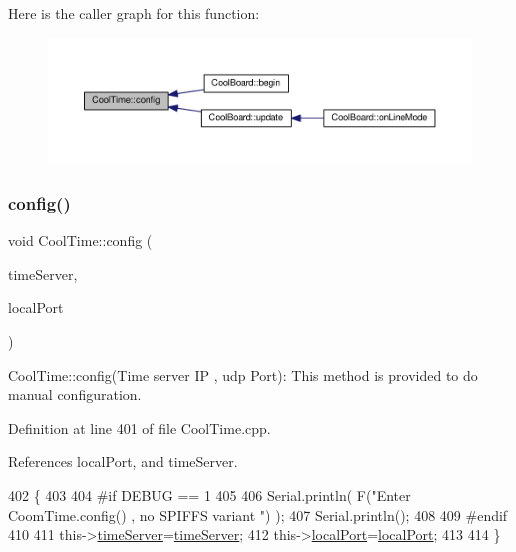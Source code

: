 Here is the caller graph for this function\+:\nopagebreak
\begin{figure}[H]
\begin{center}
\leavevmode
\includegraphics[width=350pt]{classCoolTime_a87c28260c1bc77091162cbcf1ee2e129_icgraph}
\end{center}
\end{figure}
\mbox{\label{classCoolTime_a014656d0d3f74d6391364b92b13e0780}} 
\subsubsection{\texorpdfstring{config()}{config()}\hspace{0.1cm}{\footnotesize\ttfamily [2/2]}}
{\footnotesize\ttfamily void Cool\+Time\+::config (\begin{DoxyParamCaption}\item[{I\+P\+Address}]{time\+Server,  }\item[{unsigned int}]{local\+Port }\end{DoxyParamCaption})}

Cool\+Time\+::config(\+Time server I\+P , udp Port)\+: This method is provided to do manual configuration. 

Definition at line 401 of file Cool\+Time.\+cpp.



References local\+Port, and time\+Server.


\begin{DoxyCode}
402 \{
403 
404 \textcolor{preprocessor}{#if DEBUG == 1 }
405 
406     Serial.println( F(\textcolor{stringliteral}{"Enter CoomTime.config() , no SPIFFS variant "}) );
407     Serial.println();
408 
409 \textcolor{preprocessor}{#endif }
410 
411     this->\hyperlink{classCoolTime_ad2b9858f399108cb440dd1e908916f04}{timeServer}=\hyperlink{classCoolTime_ad2b9858f399108cb440dd1e908916f04}{timeServer};
412     this->\hyperlink{classCoolTime_a2f777da44d7ba678be8185299e9b49d1}{localPort}=\hyperlink{classCoolTime_a2f777da44d7ba678be8185299e9b49d1}{localPort};
413     
414 \} 
\end{DoxyCode}
\mbox{\label{classCoolTime_acd537cd4210d7bde4e1f5c47d2ac0456}} 
